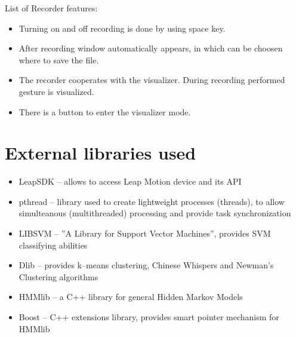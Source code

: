 List of Recorder features:
\begin{itemize}
\item Turning on and off recording is done by using space key.
\item After recording window automatically appears, in which can be choosen where to save the file.
\item The recorder cooperates with the visualizer. During recording performed gesture is visualized.
\item There is a button to enter the visualizer mode.
\end{itemize}

\section{External libraries used} \label{librariesSection}

\begin{itemize} 
\item LeapSDK -- allows to access Leap Motion device and its API
\item pthread -- library used to create lightweight processes (threads), to allow simulteanous (multithreaded) processing and provide task synchronization
\item LIBSVM -- ''A Library for Support Vector Machines'', provides SVM classifying abilities
\item Dlib -- provides k--means clustering, Chinese Whispers and Newman's Clustering algorithms
\item HMMlib -- a C++ library for general Hidden Markov Models
\item Boost -- C++ extensions library, provides smart pointer mechanism for HMMlib
\end{itemize}
